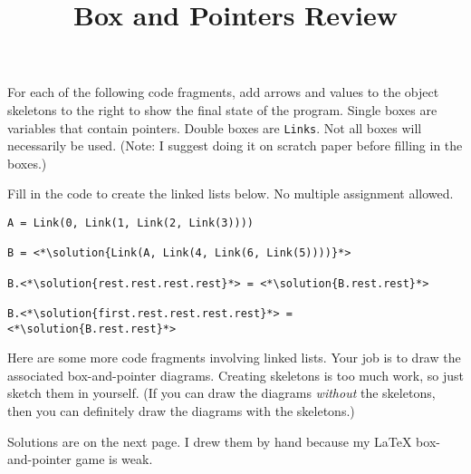 \documentclass[twoside]{article}
\title{\sc Box and Pointers Review \solution{(Solutions)}}
\newcommand{\solution}[1]{{\color{red}#1}}
\newcommand{\solutionimage}[2]{#2} %
\newcommand\solution[1]{} %
\newcommand{\solutionimage}[2]{#1} %
\begin{document}
\thispagestyle{empty}
\maketitle

\begin{enumerate}

For each of the following code fragments, add arrows and values to the object skeletons to the right to show the final state of the program.  Single boxes are variables that contain pointers.  Double boxes are \lstinline/Links/. Not all boxes will necessarily be used. (Note: I suggest doing it on scratch paper before filling in the boxes.)

\vspace{0.2in}

\solutionimage{}{}

\vspace{0.2in}

Fill in the code to create the linked lists below. No multiple assignment allowed.

\vspace{0.2in}



\vspace{0.2in}

\begin{lstlisting}
A = Link(0, Link(1, Link(2, Link(3))))

B = <*\solution{Link(A, Link(4, Link(6, Link(5))))}*>

B.<*\solution{rest.rest.rest.rest}*> = <*\solution{B.rest.rest}*>

B.<*\solution{first.rest.rest.rest.rest}*> = <*\solution{B.rest.rest}*>
\end{lstlisting}


Here are some more code fragments involving linked lists. Your job is to draw the associated box-and-pointer diagrams. Creating skeletons is too much work, so just sketch them in yourself. (If you can draw the diagrams \textit{without} the skeletons, then you can definitely draw the diagrams with the skeletons.)

\solution{Solutions are on the next page.\newline
I drew them by hand because my LaTeX box-and-pointer game is weak.}


\end{enumerate}
\end{document}
